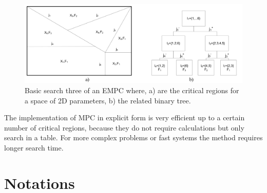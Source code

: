  \begin{figure}[!ht]
        \centering
        \includegraphics[width=\textwidth]{EMPC_PNG_Pics/BasicSearchTree.png}
        \caption{Basic search three of an EMPC where, a) are the critical regions for a space of 2D parameters,
b) the related binary tree.}
        \label{BASICMPC:fig:searchtree}
    \end{figure}

The implementation of MPC in explicit form is very efficient up to a certain number of critical regions, because they do not require calculations but only search in a table. For more complex problems or fast systems the method requires longer search time.

\section{Notations}

